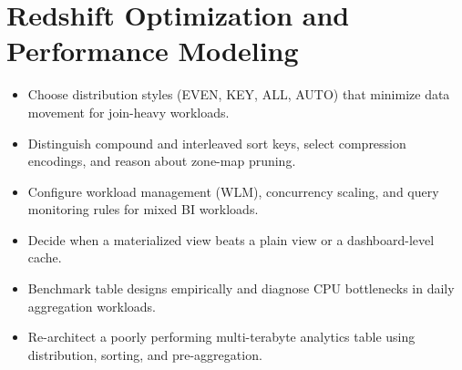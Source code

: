 \chapter{Redshift Optimization and Performance Modeling}
%
\begin{objectives}
\begin{itemize}
    \item Choose distribution styles (EVEN, KEY, ALL, AUTO) that minimize data movement for join-heavy workloads.
    \item Distinguish compound and interleaved sort keys, select compression encodings, and reason about zone-map pruning.
    \item Configure workload management (WLM), concurrency scaling, and query monitoring rules for mixed BI workloads.
    \item Decide when a materialized view beats a plain view or a dashboard-level cache.
    \item Benchmark table designs empirically and diagnose CPU bottlenecks in daily aggregation workloads.
    \item Re-architect a poorly performing multi-terabyte analytics table using distribution, sorting, and pre-aggregation.
\end{itemize}
\end{objectives}


